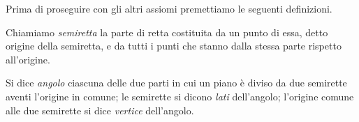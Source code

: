 \begin{inaccessibleblock}
 \begin{center} \end{center}
\end{inaccessibleblock}


Prima di proseguire con gli altri assiomi premettiamo le seguenti 
definizioni.
\begin{definizione}
Chiamiamo \emph{semiretta} la parte di retta costituita da un punto 
di essa, detto origine della semiretta, e da tutti i punti che stanno 
dalla stessa parte rispetto all'origine.
\end{definizione}

\begin{center}
 
\end{center}

\begin{definizione}
Si dice \emph{angolo} ciascuna delle due parti in cui un piano è 
diviso da due semirette aventi l'origine in comune; le semirette si 
dicono \emph{lati} dell'angolo; l'origine comune alle due semirette 
si dice \emph{vertice} dell'angolo.%
\end{definizione}
\begin{center}  \end{center}
\label{fig:1.9}


